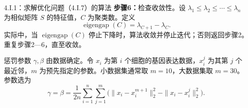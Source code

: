 \begin{bookalgorithm}{4.I.1：求解优化问题（4.I.7）的算法}
\textbf{步骤6：}检查收敛性。设 $\lambda_1\le\lambda_2\le\cdots\le\lambda_n$ 为相似矩阵 $S$ 的特征值，$C$ 为聚类数。定义
\[
\operatorname{eigengap}(C)=\lambda_{C+1}-\lambda_C.
\]
实际中，当 $\operatorname{eigengap}(C)$ 停止下降时，算法收敛并停止迭代；否则返回步骤2。重复步骤2—6，直至收敛。

惩罚参数 $\gamma,\beta$ 由数据确定。令 $x_i$ 为第 $i$ 个细胞的基因表达数据，$x_i^j$ 为其第 $j$ 个最近邻，$m$ 为预先指定的参数。小数据集通常取 $m=10$，大数据集取 $m=30$。参数选为
\begin{equation}
\gamma=\beta=\frac1{2n}\sum_{i=1}^{n}\sum_{j=1}^{m}
\bigl(\|x_i-x_i^{m+1}\|_2^2-\|x_i-x_i^j\|_2^2\bigr).\tag{4.I.35}
\end{equation}
\end{bookalgorithm}
